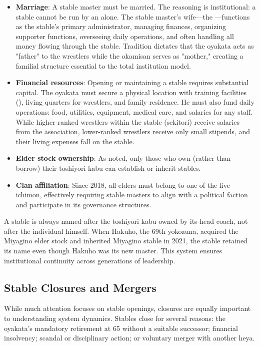 \begin{itemize}
\item \textbf{Marriage}: A stable master must be married. The reasoning is institutional: a stable cannot be run by an  alone. The stable master's wife—the —functions as the stable's primary administrator, managing finances, organizing supporter functions, overseeing daily operations, and often handling all money flowing through the stable. Tradition dictates that the oyakata acts as "father" to the wrestlers while the okamisan serves as "mother," creating a familial structure essential to the total institution model.
\item \textbf{Financial resources}: Opening or maintaining a stable requires substantial capital. The oyakata must secure a physical location with training facilities (), living quarters for wrestlers, and family residence. He must also fund daily operations: food, utilities, equipment, medical care, and salaries for any staff. While higher-ranked wrestlers within the stable (sekitori) receive salaries from the association, lower-ranked wrestlers receive only small stipends, and their living expenses fall on the stable.
\item \textbf{Elder stock ownership}: As noted, only those who own (rather than borrow) their toshiyori kabu can establish or inherit stables.
\item \textbf{Clan affiliation}: Since 2018, all elders must belong to one of the five ichimon, effectively requiring stable masters to align with a political faction and participate in its governance structures.
\end{itemize}

A stable is always named after the toshiyori kabu owned by its head coach, not after the individual himself. When Hakuho, the 69th yokozuna, acquired the Miyagino elder stock and inherited Miyagino stable in 2021, the stable retained its name even though Hakuho was its new master. This system ensures institutional continuity across generations of leadership.

\subsection{Stable Closures and Mergers}

While much attention focuses on stable openings, closures are equally important to understanding system dynamics. Stables close for several reasons: the oyakata's mandatory retirement at 65 without a suitable successor; financial insolvency; scandal or disciplinary action; or voluntary merger with another heya.


